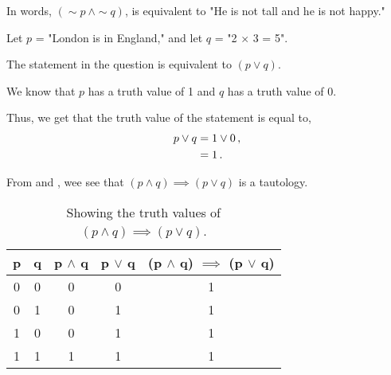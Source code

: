 %
%

\begin{subquestions}
	
	
\subquestion
	
In words, $(\sim p ~\land \sim q)$, is equivalent to "He is not tall and he is not happy."
	
	
\subquestion
	
Let $p$ = "London is in England," and let $q$ = "2 $\times$ 3 = 5". 

The statement in the question is equivalent to $(p \lor q)$. 
	
We know that $p$ has a truth value of 1 and $q$ has a truth value of 0. 
	
Thus, we get that the truth value of the statement is equal to,
\begin{align}
		p \lor q &= 1 \lor 0\,, \nonumber \\
		&= 1\,.
\end{align}
	
	
\subquestion
	
From  and , wee see that $(p \land q) \implies (p \lor q)$ is a tautology.
\begin{table}[ht]
		\centering
		\begin{tabular}{|c|c|c|c|c|}
			\hline
			p & q & p $\land$ q & p $\lor$ q & (p $\land$ q) $\implies$ (p $\lor$ q) \\
			\hline
			0 & 0 & 0 & 0 & 1 \\
			0 & 1 & 0 & 1 & 1 \\
			1 & 0 & 0 & 1 & 1 \\
			1 & 1 & 1 & 1 & 1 \\
			\hline
		\end{tabular}
		\caption{\label{2008:q2:tab:TruthTab1} Showing the truth values of $(p \land q) \implies (p \lor q)$.}
\end{table}
	

\end{subquestions}
